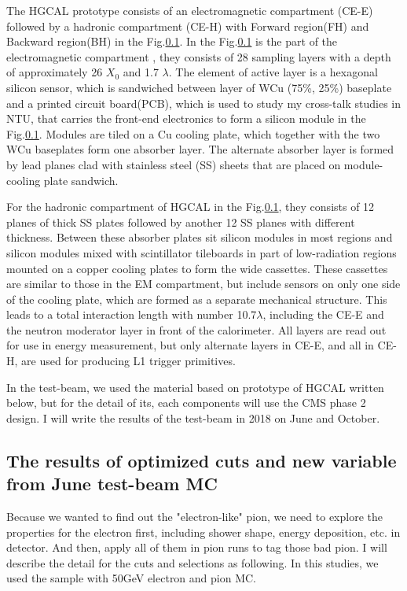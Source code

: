 The HGCAL prototype consists of an electromagnetic compartment (CE-E) followed by a hadronic compartment (CE-H) with Forward region(FH) and Backward region(BH) in the Fig.\ref{}. In the Fig.\ref{} is the part of the electromagnetic compartment , they consists of 28 sampling layers with a depth of approximately 26 $X_{0}$ and 1.7 $\lambda$. The element of active layer is a hexagonal silicon sensor, which is sandwiched between layer of WCu (75\%, 25\%) baseplate and a printed circuit board(PCB), which is used to study my cross-talk studies in NTU, that carries the front-end electronics to form a silicon module in the Fig.\ref{}. Modules are tiled on a Cu cooling plate, which together with the two WCu baseplates form one absorber layer. The alternate absorber layer is formed by lead planes clad with stainless steel (SS) sheets that are placed on module-cooling plate sandwich. 

For the hadronic compartment of HGCAL in the Fig.\ref{}, they consists of 12 planes of thick SS plates followed by another 12 SS planes with different thickness. Between these absorber plates sit silicon modules in most regions and silicon modules mixed with scintillator tileboards in part of low-radiation regions mounted on a copper cooling plates to form the wide cassettes. These cassettes are similar to those in the EM compartment, but include sensors on only one side of the cooling plate, which are formed as a separate mechanical structure. This leads to a total interaction length with number 10.7$\lambda$, including the CE-E and the neutron moderator layer in front of the calorimeter. All layers are read out for use in energy measurement, but only alternate layers in CE-E, and all in CE-H, are used for producing L1 trigger primitives. 

In the test-beam, we used the material based on prototype of HGCAL written below,  but for the detail of its, each components will use the CMS phase 2 design. I will write the results of the test-beam in 2018 on June and October.

\subsection{The results of optimized cuts and new variable from June test-beam MC}

Because we wanted to find out the "electron-like" pion, we need to explore the properties for the electron first, including shower shape, energy deposition, etc. in detector. And then, apply all of them in pion runs to tag those bad pion. I will describe the detail for the cuts and selections as following. In this studies, we used the sample with 50GeV electron and pion MC.

